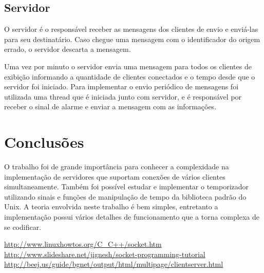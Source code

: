 \documentclass[a4paper,10pt]{article}
\begin{document}
\subsection{Servidor}

O servidor é o responsável receber as mensagens dos clientes de envio e enviá-las para seu destinatário.
Caso chegue uma mensagem com o identificador do origem errado, o servidor descarta a mensagem.

Uma vez por minuto
o servidor envia uma mensagem para todos os clientes de exibição informando a quantidade de clientes conectados
e o tempo desde que o servidor foi iniciado. Para implementar o envio periódico de mensagens foi utilizada uma thread
que é iniciada junto com servidor, e é responsável por receber o sinal de alarme e enviar a mensagem com
as informações.

\section{Conclusões}

O trabalho foi de grande importância para conhecer a complexidade na
implementação de servidores que suportam conexões de vários clientes
simultaneamente. Também foi possível estudar e implementar o temporizador
utilizando sinais e funções de manipulação de tempo da biblioteca padrão do
Unix. A teoria envolvida neste trabalho é bem simples, entretanto a implementação possui vários detalhes de funcionamento que a
torna complexa de se codificar.

\clearpage
\begin{thebibliography}{99}
 \url{http://www.linuxhowtos.org/C_C++/socket.htm}
 \url{http://www.slideshare.net/jignesh/socket-programming-tutorial}
 \url{http://beej.us/guide/bgnet/output/html/multipage/clientserver.html}
\end{thebibliography}
\end{document}
